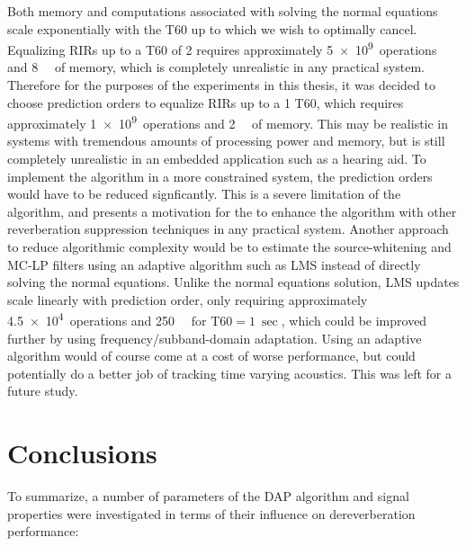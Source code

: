 Both memory and computations associated with solving the normal equations scale exponentially with the T60 up to which we wish to optimally cancel. Equalizing RIRs up to a T60 of \qty{2}{\sec} requires approximately \qty{5e9}{operations} and  \qty{8}{\giga\byte} of memory, which is completely unrealistic in any practical system. Therefore for the purposes of the experiments in this thesis, it was decided to choose prediction orders to equalize RIRs up to a \qty{1}{\sec} T60, which requires approximately \qty{1e9}{operations} and \qty{2}{\giga\byte} of memory. This may be realistic in systems with tremendous amounts of processing power and memory, but is still completely unrealistic in an embedded application such as a hearing aid. To implement the algorithm in a more constrained system, the prediction orders would have to be reduced signficantly. This is a severe limitation of the algorithm, and presents a motivation for the to enhance the algorithm with other reverberation suppression techniques in any practical system. Another approach to reduce algorithmic complexity would be to estimate the source-whitening and MC-LP filters using an adaptive algorithm such as LMS instead of directly solving the normal equations. Unlike the normal equations solution, LMS updates scale linearly with prediction order, only requiring approximately \qty{4.5e4}{operations} and \qty{250}{\kilo\byte} for $\mathrm{T60} = \qty{1}{\sec}$, which could be improved further by using frequency/subband-domain adaptation. Using an adaptive algorithm would of course come at a cost of worse performance, but could potentially do a better job of tracking time varying acoustics. This was left for a future study.


\section{Conclusions} \label{section:params_conclusion}

To summarize, a number of parameters of the DAP algorithm and signal properties were investigated in terms of their influence on dereverberation performance: 

